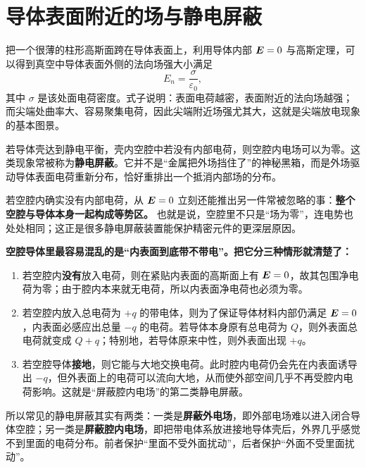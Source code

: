 \documentclass[lang=cn,11pt]{elegantbook}
\begin{document}
\section{导体表面附近的场与静电屏蔽}

把一个很薄的柱形高斯面跨在导体表面上，利用导体内部 \(\vb*{E}=0\) 与高斯定理，可以得到真空中导体表面外侧的法向场强大小满足
\[
E_n=\frac{\sigma}{\varepsilon_0},
\]
其中 \(\sigma\) 是该处面电荷密度。式子说明：表面电荷越密，表面附近的法向场越强；而尖端处曲率大、容易聚集电荷，因此尖端附近场强尤其大，这就是尖端放电现象的基本图景。

若导体壳达到静电平衡，壳内空腔中若没有内部电荷，则空腔内电场可以为零。这类现象常被称为\textbf{静电屏蔽}。它并不是“金属把外场挡住了”的神秘黑箱，而是外场驱动导体表面电荷重新分布，恰好重排出一个抵消内部场的分布。

\begin{remark}
若空腔内确实没有内部电荷，从 \(\vb*{E}=0\) 立刻还能推出另一件常被忽略的事：\textbf{整个空腔与导体本身一起构成等势区。} 也就是说，空腔里不只是“场为零”，连电势也处处相同；这正是很多静电屏蔽装置能保护精密元件的更深层原因。
\end{remark}

\begin{note}
\textbf{空腔导体里最容易混乱的是“内表面到底带不带电”。把它分三种情形就清楚了：}
\begin{enumerate}
  \item 若空腔内\textbf{没有}放入电荷，则在紧贴内表面的高斯面上有 \(\vb*{E}=0\)，故其包围净电荷为零；由于腔内本来就无电荷，所以内表面净电荷也必须为零。
  \item 若空腔内放入总电荷为 \(+q\) 的带电体，则为了保证导体材料内部仍满足 \(\vb*{E}=0\)，内表面必感应出总量 \(-q\) 的电荷。若导体本身原有总电荷为 \(Q\)，则外表面总电荷就变成 \(Q+q\)；特别地，若导体原来中性，则外表面出现 \(+q\)。
  \item 若空腔导体\textbf{接地}，则它能与大地交换电荷。此时腔内电荷仍会先在内表面诱导出 \(-q\)，但外表面上的电荷可以流向大地，从而使外部空间几乎不再受腔内电荷影响。这就是“屏蔽腔内电场”的第二类静电屏蔽。
\end{enumerate}
\end{note}

\begin{remark}
所以常见的静电屏蔽其实有两类：一类是\textbf{屏蔽外电场}，即外部电场难以进入闭合导体空腔；另一类是\textbf{屏蔽腔内电场}，即把带电体系放进接地导体壳后，外界几乎感觉不到里面的电荷分布。前者保护“里面不受外面扰动”，后者保护“外面不受里面扰动”。
\end{remark}
\end{document}
